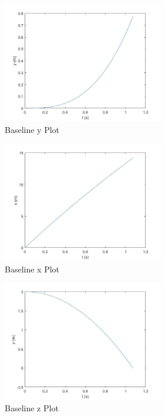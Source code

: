 \documentclass[12pt,twoside,letterpaper]{article}
\begin{document}
\begin{multicols}{3}

\begin{figure}[H]
\centering
\includegraphics[width=7cm]{figures/baseline_y.jpg}
\caption{Baseline y Plot}
\label{Baseline y Plot}
\end{figure}

\begin{figure}[H]
\centering
\includegraphics[width=7cm]{figures/baseline_x.jpg}
\caption{Baseline x Plot}
\label{Baseline x Plot}
\end{figure}

\begin{figure}[H]
\centering
\includegraphics[width=7cm]{figures/baseline_z.jpg}
\caption{Baseline z Plot}
\label{Baseline z Plot}
\end{figure}
\end{multicols}
\newpage

\end{document}
